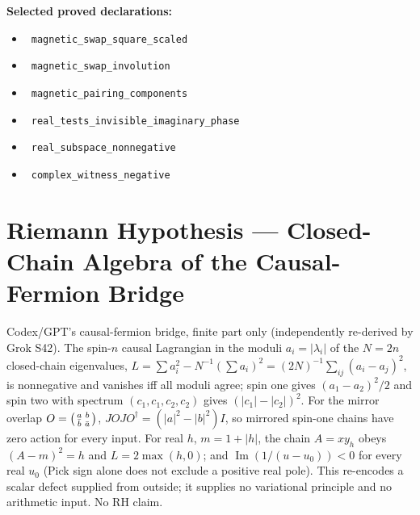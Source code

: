 \documentclass{report}
\theoremstyle{definition}
\begin{document}
\noindent\textbf{Selected proved declarations:}
\begin{itemize}
  \item {}\leanok\ \texttt{magnetic\_swap\_square\_scaled}
  \item {}\leanok\ \texttt{magnetic\_swap\_involution}
  \item {}\leanok\ \texttt{magnetic\_pairing\_components}
  \item {}\leanok\ \texttt{real\_tests\_invisible\_imaginary\_phase}
  \item {}\leanok\ \texttt{real\_subspace\_nonnegative}
  \item {}\leanok\ \texttt{complex\_witness\_negative}
\end{itemize}

\section{Riemann Hypothesis --- Closed-Chain Algebra of the Causal-Fermion Bridge}
Codex/GPT's causal-fermion bridge, finite part only (independently re-derived by Grok S42). The spin-$n$ causal Lagrangian in the moduli $a_i=|\lambda_i|$ of the $N=2n$ closed-chain eigenvalues, $L=\sum a_i^2-N^{-1}(\sum a_i)^2=(2N)^{-1}\sum_{ij}(a_i-a_j)^2$, is nonnegative and vanishes iff all moduli agree; spin one gives $(a_1-a_2)^2/2$ and spin two with spectrum $(c_1,c_1,c_2,c_2)$ gives $(|c_1|-|c_2|)^2$. For the mirror overlap $O=\begin{psmallmatrix}a&b\\\bar b&\bar a\end{psmallmatrix}$, $JOJO^\dagger=(|a|^2-|b|^2)I$, so mirrored spin-one chains have zero action for every input. For real $h$, $m=1+|h|$, the chain $A=xy_h$ obeys $(A-m)^2=h$ and $L=2\max(h,0)$; and $\operatorname{Im}(1/(u-u_0))<0$ for every real $u_0$ (Pick sign alone does not exclude a positive real pole). This re-encodes a scalar defect supplied from outside; it supplies no variational principle and no arithmetic input. No RH claim.
\end{document}
